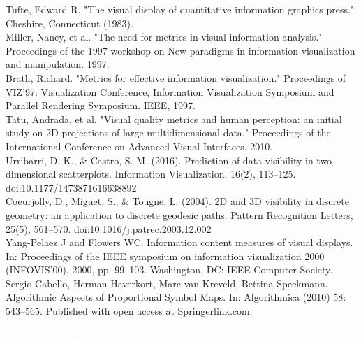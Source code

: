 \documentclass[a4paper,11pt]{article}
\begin{document}

\newpage

\begin{thebibliography}{999}

Tufte, Edward R. "The visual display of quantitative information graphics press." Cheshire, Connecticut (1983).\\

Miller, Nancy, et al. "The need for metrics in visual information analysis." Proceedings of the 1997 workshop on New paradigms in information visualization and manipulation. 1997.\\

Brath, Richard. "Metrics for effective information visualization." Proceedings of VIZ'97: Visualization Conference, Information Visualization Symposium and Parallel Rendering Symposium. IEEE, 1997.\\

Tatu, Andrada, et al. "Visual quality metrics and human perception: an initial study on 2D projections of large multidimensional data." Proceedings of the International Conference on Advanced Visual Interfaces. 2010.\\

Urribarri, D. K., \& Castro, S. M. (2016). Prediction of data visibility in two-dimensional scatterplots. Information Visualization, 16(2), 113–125. doi:10.1177/1473871616638892\\

Coeurjolly, D., Miguet, S., \& Tougne, L. (2004). 2D and 3D visibility in discrete geometry: an application to discrete geodesic paths. Pattern Recognition Letters, 25(5), 561–570. doi:10.1016/j.patrec.2003.12.002\\

Yang-Pelaez J and Flowers WC. Information content
measures of visual displays. In: Proceedings of the IEEE symposium on information vizualization 2000 (INFOVIS’00), 2000, pp. 99–103. Washington, DC: IEEE Computer Society.\\

Sergio Cabello, Herman Haverkort, Marc van Kreveld, Bettina Speckmann. Algorithmic Aspects of Proportional Symbol Maps. In: Algorithmica (2010) 58: 543–565. Published with open access at Springerlink.com.%



\end{thebibliography}

  ----------------------
\end{document}

